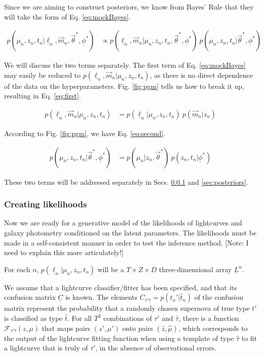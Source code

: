 \documentclass[12pt, onecolumn]{emulateapj}
\newcommand{\textul}{\underline}
\begin{document}
Since we are aiming to construct posteriors, we know from Bayes' Rule that they will take the form of Eq. \ref{eq:mockBayes}.

\begin{align}
\label{eq:mockBayes}
p(\mu_{n}, z_{n}, t_{n} | \textul{\ell}_{n}, \vec{m}_{n}, \vec{\theta}^{*}, \textul{\phi}^{*}) &\propto p(\textul{\ell}_{n}, \vec{m}_{n} | \mu_{n}, z_{n}, t_{n}, \vec{\theta}^{*}, \textul{\phi}^{*})\ p(\mu_{n}, z_{n}, t_{n} | \vec{\theta}^{*}, \textul{\phi}^{*})
\end{align}

We will discuss the two terms separately. The first term of Eq. \ref{eq:mockBayes} may easily be reduced to $p(\textul{\ell}_{n}, \vec{m}_{n} | \mu_{n}, z_{n}, t_{n})$, as there is no direct dependence of the data on the hyperparameters.  Fig. \ref{fig:pgm} tells us how to break it up, resulting in Eq. \ref{eq:first}.

\begin{align}
\label{eq:first}
p(\textul{\ell}_{n}, \vec{m}_{n} | \mu_{n}, z_{n}, t_{n}) &= p(\textul{\ell}_{n} | \mu_{n}, z_{n}, t_{n})\ p(\vec{m}_{n} | z_{n})
\end{align}

 According to Fig. \ref{fig:pgm}, we have Eq. \ref{eq:second}.

\begin{align}
\label{eq:second}
p(\mu_{n}, z_{n}, t_{n} | \vec{\theta}^{*}, \textul{\phi}^{*}) &= p(\mu_{n} | z_{n}, \vec{\theta}^{*})\ p(z_{n}, t_{n} | \textul{\phi}^{*})
\end{align}

These two terms will be addressed separately in Secs. \ref{sec:likelihoods} and \ref{sec:posteriors}.

\subsubsection{Creating likelihoods}
\label{sec:likelihoods}

Now we are ready for a generative model of the likelihoods of lightcurves and galaxy photometry conditioned on the latent parameters.  The likelihoods must be made in a self-consistent manner in order to test the inference method.  [Note: I need to explain this more articulately!]  

For each $n$, $p(\textul{\ell}_{n} | \mu_{n}, z_{n}, t_{n})$ will be a $T\times Z\times D$ three-dimensional array $\textul{L}^{n}$.  

We assume that a lightcurve classifier/fitter has been specified, and that its confusion matrix $\textul{C}$ is known.  The elements $C_{\tau'\hat{\tau}} = p(t_{n}' | \hat{t}_{n})$ of the confusion matrix represent the probability that a randomly chosen supernova of true type $t'$ is classified as type $\hat{t}$.  For all $T^{2}$ combinations of $\tau'$ and $\hat{\tau}$, there is a function $\mathcal{F}_{\tau'\hat{\tau}}(z, \mu)$ that maps pairs $(z', \mu')$ onto pairs $(\hat{z}, \hat{\mu})$, which corresponds to the output of the lightcurve fitting function when using a template of type $\hat{\tau}$ to fit a lightcurve that is truly of $\tau'$, in the absence of observational errors.  
\end{document}
